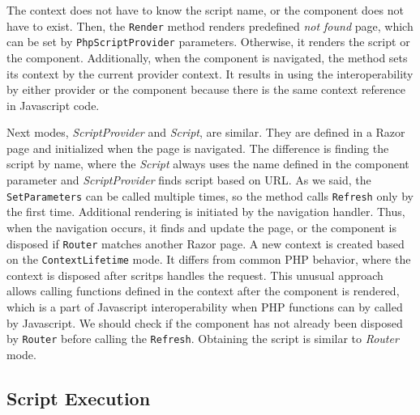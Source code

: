 The context does not have to know the script name, or the component does not have to exist. 
Then, the \texttt{Render} method renders predefined \textit{not found} page, which can be set by \texttt{PhpScriptProvider} parameters.
Otherwise, it renders the script or the component.
Additionally, when the component is navigated, the method sets its context by the current provider context.
It results in using the interoperability by either provider or the component because there is the same context reference in Javascript code.
\par
Next modes, \textit{ScriptProvider} and \textit{Script}, are similar.
They are defined in a Razor page and initialized when the page is navigated.  
The difference is finding the script by name, where the \textit{Script} always uses the name defined in the component parameter and \textit{ScriptProvider} finds script based on URL.
As we said, the \texttt{SetParameters} can be called multiple times, so the method calls \texttt{Refresh} only by the first time.
Additional rendering is initiated by the navigation handler.
Thus, when the navigation occurs, it finds and update the page, or the component is disposed if \texttt{Router} matches another Razor page.
A new context is created based on the \texttt{ContextLifetime} mode.
It differs from common PHP behavior, where the context is disposed after scritps handles the request.
This unusual approach allows calling functions defined in the context after the component is rendered, which is a part of Javascript interoperability when PHP functions can by called by Javascript.
We should check if the component has not already been disposed by \texttt{Router} before calling the \texttt{Refresh}.
Obtaining the script is similar to \textit{Router} mode.

\subsection{Script Execution}

